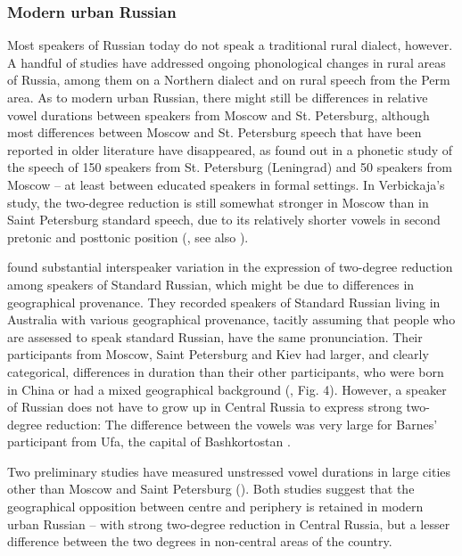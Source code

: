 \documentclass[output=paper]{langscibook}
\begin{document}
\subsubsection{Modern urban Russian}
\label{sec:post:1.2.3}
Most speakers of Russian today do not speak a traditional rural dialect, however. A handful of studies have addressed ongoing phonological changes in rural areas of Russia, among them \citet{Paufošima1978} on a Northern dialect and \citet{Kochetov2006} on rural speech from the Perm area. As to modern urban Russian, there might still be differences in relative vowel durations between speakers from Moscow and St. Petersburg, although most differences between Moscow and St. Petersburg speech that have been reported in older literature have disappeared, as \citet{Verbickaja1977} found out in a phonetic study of the speech of 150 speakers from St. Petersburg (Leningrad) and 50 speakers from Moscow -- at least between educated speakers in formal settings. In Verbickaja’s study, the two-degree reduction is still somewhat stronger in Moscow than in Saint Petersburg standard speech, due to its relatively shorter vowels in second pretonic and posttonic position (\citealt{Verbickaja1977}, see also \citealt{Nikolaeva1977, Kuznecov1997}). 



\citet{PadgettTabain2005} found substantial interspeaker variation in the expression of two-degree reduction among speakers of Standard Russian, which might be due to differences in geographical provenance. They recorded speakers of Standard Russian living in Australia with various geographical provenance, tacitly assuming that people who are assessed to speak standard Russian, have the same pronunciation. Their participants from Moscow, Saint Petersburg and Kiev had larger, and clearly categorical, differences in duration than their other participants, who were born in China or had a mixed geographical background (\citealt[42]{PadgettTabain2005}, Fig. 4). However, a speaker of Russian does not have to grow up in Central Russia to express strong two-degree reduction: The difference between the vowels was very large for Barnes’ participant from Ufa, the capital of Bashkortostan \citep{Barnes2006}.



Two preliminary studies have measured unstressed vowel durations in large cities other than Moscow and Saint Petersburg (\citealt{GrammatčikovaPožarickaja2013, Erofeeva2005}). Both studies suggest that the geographical opposition between centre and periphery is retained in modern urban Russian -- with strong two-degree reduction in Central Russia, but a lesser difference between the two degrees in non-central areas of the country.
\end{document}
